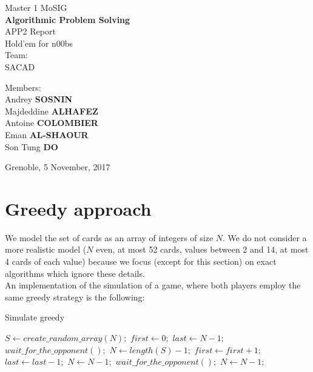 \documentclass{article}
\begin{document}
\begin{titlepage}
\begin{center}

\vspace*{5cm}
{\large Master 1 MoSIG}\\[0.5cm]

{\Huge \textbf{Algorithmic Problem Solving} }\\[0.5cm]
{\large APP2 Report} \\
Hold'em for n00bs\\ 
Team:\\SACAD
\vfill

\noindent
\begin{minipage}{0.4\textwidth}

   \centering Members:\\Andrey \textbf{SOSNIN}\\Majdeddine \textbf{ALHAFEZ}\\Antoine \textbf{COLOMBIER}\\Eman \textbf{AL-SHAOUR}\\Son Tung \textbf{DO}\\

\end{minipage}%

\vfill
{Grenoble, 5 November, 2017}
\clearpage

\tableofcontents

\end{center}
\end{titlepage}
\section{Greedy approach}
We model the set of cards as an array of integers of size $N$. We do not consider a more realistic model ($N$ even, at most 52 cards, values between 2 and 14, at most 4 cards of each value) because we focus (except for this section) on exact algorithms which ignore these details.\\
An implementation of the simulation of a game, where both players employ the same greedy strategy is the following:

\begin{algorithm}[H]
\caption{Simulate greedy}
\begin{algorithmic} 
\State $S \leftarrow create\_random\_array(N);$
\State $first \leftarrow 0;$
\State $last \leftarrow N - 1;$
\State $wait\_for\_the\_opponent();$
\State $N \leftarrow length(S) - 1;$
        \State $first \leftarrow first + 1;$
    \Else
        \State $last \leftarrow last - 1;$
    \EndIf
    \State $N \leftarrow N - 1;$
        \State $wait\_for\_the\_opponent();$
        \State $N \leftarrow N - 1;$
    \EndIf
\EndWhile
\end{algorithmic}
\end{algorithm}
\end{document}
